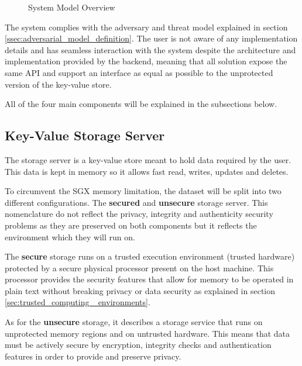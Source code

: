 
\begin{figure}[htbp]
  \caption{System Model Overview}
  \label{fig:system_model_overview}
\end{figure}

The system complies with the adversary and threat model explained in section \ref{ssec:adversarial_model_definition}. The user is not aware of any implementation details and has seamless interaction with the system despite the architecture and implementation provided by the backend, meaning that all solution expose the same \gls{API} and support an interface as equal as possible to the unprotected version of the key-value store. 

All of the four main components will be explained in the subsections below.

\subsection{Key-Value Storage Server}
\label{ssec:key-value_storage_server}

The storage server is a key-value store meant to hold data required by the user. This data is kept in memory so it allows fast read, writes, updates and deletes.

To circumvent the \gls{SGX} memory limitation, the dataset will be split into two different configurations. The \textbf{secured} and \textbf{unsecure} storage server. This nomenclature do not reflect the privacy, integrity and authenticity security problems as they are preserved on both components but it reflects the environment which they will run on.

The \textbf{secure} storage runs on a trusted execution environment (trusted hardware) protected by a secure physical processor present on the host machine. This processor provides the security features that allow for memory to be operated in plain text without breaking privacy or data security as explained in section \ref{sec:trusted_computing _environments}.

As for the \textbf{unsecure} storage, it describes a storage service that runs on unprotected memory regions and on untrusted hardware. This means that data must be actively secure by encryption, integrity checks and authentication features in order to provide and preserve privacy.

